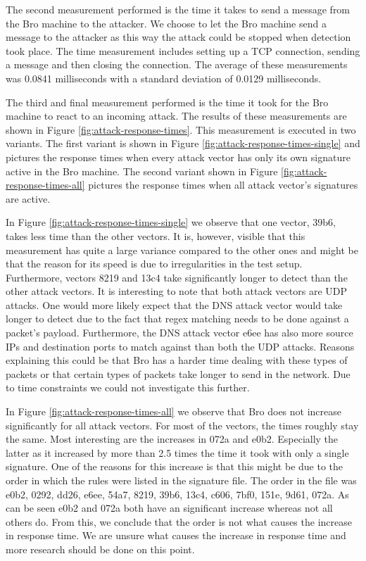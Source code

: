 The second measurement performed is the time it takes to send a message from the Bro machine to the attacker. We choose to let the Bro machine send a message to the attacker as this way the attack could be stopped when detection took place. The time measurement includes setting up a TCP connection, sending a message and then closing the connection. The average of these measurements was 0.0841 milliseconds with a standard deviation of 0.0129 milliseconds.  

The third and final measurement performed is the time it took for the Bro machine to react to an incoming attack. The results of these measurements are shown in Figure \ref{fig:attack-response-times}. This measurement is executed in two variants. The first variant is shown in Figure \ref{fig:attack-response-times-single} and pictures the response times when every attack vector has only its own signature active in the Bro machine. The second variant shown in Figure \ref{fig:attack-response-times-all} pictures the response times when all attack vector's signatures are active. 

In Figure \ref{fig:attack-response-times-single} we observe that one vector, 39b6, takes less time than the other vectors. It is, however, visible that this measurement has quite a large variance compared to the other ones and might be that the reason for its speed is due to irregularities in the test setup. Furthermore, vectors 8219 and 13c4 take significantly longer to detect than the other attack vectors. It is interesting to note that both attack vectors are UDP attacks. One would more likely expect that the DNS attack vector would take longer to detect due to the fact that regex matching needs to be done against a packet's payload. Furthermore, the DNS attack vector e6ee has also more source IPs and destination ports to match against than both the UDP attacks. Reasons explaining this could be that Bro has a harder time dealing with these types of packets or that certain types of packets take longer to send in the network. Due to time constraints we could not investigate this further.  

In Figure \ref{fig:attack-response-times-all} we observe that Bro does not increase significantly for all attack vectors. For most of the vectors, the times roughly stay the same. Most interesting are the increases in 072a and e0b2. Especially the latter as it increased by more than 2.5 times the time it took with only a single signature. One of the reasons for this increase is that this might be due to the order in which the rules were listed in the signature file. The order in the file was e0b2, 0292, dd26, e6ee, 54a7, 8219, 39b6, 13c4, c606, 7bf0, 151e, 9d61, 072a. As can be seen e0b2 and 072a both have an significant increase whereas not all others do. From this, we conclude that the order is not what causes the increase in response time. We are unsure what causes the increase in response time and more research should be done on this point.  

